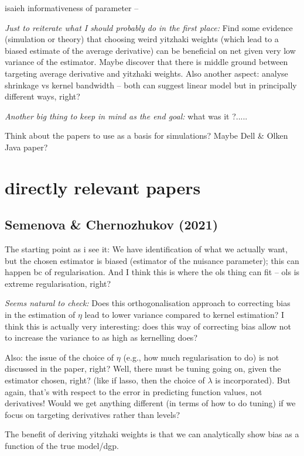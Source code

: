 \documentclass[a4paper,12pt,twoside]{article}
\begin{document}
isaieh informativeness of parameter -- 


\textit{Just to reiterate what I should probably do in the first place:} Find some evidence (simulation or theory) that choosing weird yitzhaki weights (which lead to a biased estimate of the average derivative) can be beneficial on net given very low variance of the estimator. Maybe discover that there is middle ground between targeting average derivative and yitzhaki weights. Also another aspect: analyse shrinkage vs kernel bandwidth -- both can suggest linear model but in principally different ways, right?

\textit{Another big thing to keep in mind as the end goal:} what was it ?.....


Think about the papers to use as a basis for simulations? Maybe Dell \& Olken Java paper?


\section*{directly relevant papers}

\subsection*{Semenova \& Chernozhukov (2021)}

The starting point as i see it: We have identification of what we actually want, but the chosen estimator is biased (estimator of the nuisance parameter); this can happen bc of regularisation. And I think this is where the ols thing can fit -- ols is extreme regularisation, right?

\textit{Seems natural to check:} Does this orthogonalisation approach to correcting bias in the estimation of $\eta$ lead to lower variance compared to kernel estimation? I think this is actually very interesting: does this way of correcting bias allow not to increase the variance to as high as kernelling does?

Also: the issue of the choice of $\eta$ (e.g., how much regularisation to do) is not discussed in the paper, right? Well, there must be tuning going on, given the estimator chosen, right? (like if lasso, then the choice of $\lambda$ is incorporated). But again, that's with respect to the error in predicting function values, not derivatives! Would we get anything different (in terms of how to do tuning) if we focus on targeting derivatives rather than levels?

The benefit of deriving yitzhaki weights is that we can analytically show bias as a function of the true model/dgp.
\end{document}
